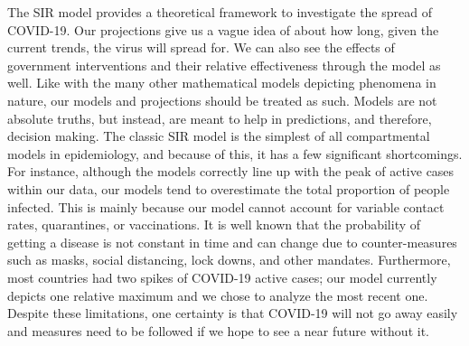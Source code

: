 \documentclass[a4paper,10pt]{article}
\begin{document}
The SIR model provides a theoretical framework to investigate the spread of COVID-19. Our projections give us a vague idea of about how long, given the current trends, the virus will spread for. We can also see the effects of government interventions and their relative effectiveness through the model as well. Like with the many other mathematical models depicting phenomena in nature, our models and projections should be treated as such. Models are not absolute truths, but instead, are meant to help in predictions, and therefore, decision making. The classic SIR model is the simplest of all compartmental models in epidemiology, and because of this, it has a few significant shortcomings. For instance, although the models correctly line up with the peak of active cases within our data, our models tend to overestimate the total proportion of people infected. This is mainly because our model cannot account for variable contact rates, quarantines, or vaccinations. It is well known that the probability of getting a disease is not constant in time and can change due to counter-measures such as masks, social distancing, lock downs, and other mandates. Furthermore,  most countries had two spikes of COVID-19 active cases; our model currently depicts one relative maximum and we chose to analyze the most recent one. Despite these limitations, one certainty is that COVID-19 will not go away easily and measures need to be followed if we hope to see a near future without it. 


\end{document}
